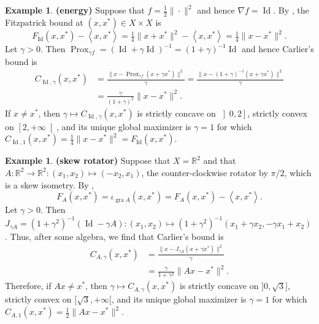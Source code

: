 \documentclass[12pt]{article}
\newcommand{\thalb}{\ensuremath{\tfrac{1}{2}}}
\newcommand{\scal}[2]{\left\langle{#1},{#2}  \right\rangle}
\newcommand{\RR}{\ensuremath{\mathbb R}}
\newcommand{\prox}{\ensuremath{\operatorname{Prox}}}
\newcommand{\Id}{\ensuremath{\operatorname{Id}}}
\theoremstyle{definition}
\newtheorem{example}[theorem]{Example}
\providecommand{\RR}{\mathbb{R}}
\providecommand{\gr}{\operatorname{gra}}
\providecommand{\Id}{\operatorname{{ Id}}}
\providecommand{\gr}{\operatorname{gra}}
\providecommand{\Id}{\operatorname{Id}}
\providecommand{\RR}{\mathbb{R}}
\begin{document}
{\begin{example} {\bf (energy)} 
\label{ex:earlyId}
Suppose that $f=\thalb\|\cdot\|^2$ and hence $\nabla f = \Id$. 
By \cite[Example~3.10]{BMS}, the Fitzpatrick bound at $(x,x^*)\in X\times X$ is 
\begin{equation}
F_{\Id}(x,x^*)-\scal{x}{x^*} = \tfrac{1}{4}\|x+x^*\|^2 - \scal{x}{x^*}=
\tfrac{1}{4}\|x-x^*\|^2. 
\end{equation}
Let $\gamma>0$. Then $\prox_{\gamma f} = (\Id+\gamma\Id)^{-1}= (1+\gamma)^{-1}\Id$ and hence Carlier's bound is 
\begin{subequations}
\label{e:CearlyId}
\begin{align}
C_{\Id,\gamma}(x,x^*) 
&= \frac{\|x-\prox_{\gamma f}(x+\gamma x^*)\|^2}{\gamma}
= \frac{\|x-(1+\gamma)^{-1}(x+\gamma x^*)\|^2}{\gamma}\\
&= \frac{\gamma}{(1+\gamma)^2}\|x-x^*\|^2. 
\end{align}
\end{subequations}
If $x\neq x^*$, then 
$\gamma\mapsto C_{\Id,\gamma}(x,x^*)$ is strictly concave
on $\left]0,2\right]$, strictly convex on $\left[2,+\infty\right[$, 
and its unique global maximizer is $\gamma=1$ for which 
$C_{\Id,1}(x,x^*)=\tfrac{1}{4}\|x-x^*\|^2 = F_{\Id}(x,x^*)$. 
\end{example}


\begin{example} {\bf (skew rotator)} 
Suppose that $X=\RR^2$ and that 
$A\colon\RR^2\to\RR^2\colon(x_1,x_2)\mapsto(-x_2,x_1)$, the counter-clockwise
rotator by $\pi/2$, which is a skew isometry. 
By \cite[Proposition~7.4]{BBW07}, 
\begin{equation}
F_A(x,x^*) = \iota_{\gr A}(x,x^*)=F_A(x,x^*)-\scal{x}{x^*}.
\end{equation}
Let $\gamma>0$. Then $J_{\gamma A} = (1+\gamma^2)^{-1}(\Id-\gamma A)\colon 
(x_1,x_2)\mapsto (1+\gamma^2)^{-1}(x_1+\gamma x_2,-\gamma x_1 + x_2)$. 
Thus, after some algebra, we find that Carlier's bound is 
\begin{align}
C_{A,\gamma}(x,x^*) 
&=
\frac{\|x-J_{\gamma A}(x+\gamma x^*)\|^2}{\gamma}\\
&=
\frac{\gamma}{1+\gamma^2}\|Ax-x^*\|^2.
\end{align}
Therefore, if $Ax\neq x^*$, then 
$\gamma\mapsto C_{A,\gamma}(x,x^*)$ is strictly concave
on $\big]0,\sqrt{3}\big]$, strictly convex on 
$\textstyle \big[\sqrt{3},+\infty\big[$, 
and its unique global maximizer is $\gamma=1$ for which 
$C_{A,1}(x,x^*)=\tfrac{1}{2}\|Ax-x^*\|^2$. 
\end{example}


}
\end{document}
